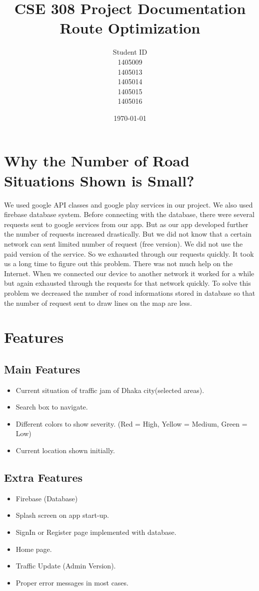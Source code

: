 \documentclass{article}
\title{CSE 308 Project Documentation\\Route Optimization}
\author{Student ID\\1405009\\1405013\\1405014\\1405015\\1405016}
\date{\today}
\begin{document}
\maketitle
\section{Why the Number of Road Situations Shown is Small?}
We used google API classes and google play services in our project. We also used firebase database system. Before connecting with the database, there were several requests sent to google services from our app. But as our app developed further the number of requests increased drastically. But we did not know that a certain network can sent limited number of request (free version). We did not use the paid version of the service. So we exhausted through our requests quickly. It took us a long time to figure out this problem. There was not much help on the Internet. When we connected our device to another network it worked for a while but again exhausted through the requests for that network quickly. To solve this problem we decreased the number of road informations stored in database so that the number of request sent to draw lines on the map are less.
\section{Features}
\subsection{Main Features}
\begin{itemize}
\item Current situation of traffic jam of Dhaka city(selected areas).
\item Search box to navigate.
\item Different colors to show severity. (Red = High, Yellow = Medium, Green = Low)
\item Current location shown initially.
\end{itemize}
\subsection{Extra Features}
\begin{itemize}
\item Firebase (Database)
\item Splash screen on app start-up.
\item SignIn or Register page implemented with database.
\item Home page.
\item Traffic Update (Admin Version).
\item Proper error messages in most cases.  
\end{itemize}
\end{document}
